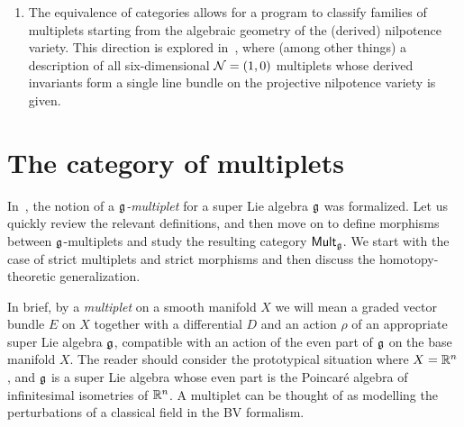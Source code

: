 \documentclass[pdftex]{sigma}
\numberwithin{equation}{section}
\def\cat#1{\ensuremath{\mathsf{#1}}}
\DeclareMathOperator{\Mult}{\cat{Mult}}
\begin{document}
\begin{enumerate}
	To give a further example, the tangent sheaf $\mathrm{Der}(C^\bullet(\fn))$ carries a Lie bracket for all supertranslation algebras $\fn$. While the associated multiplet is not generally associated to a BV theory---it does not typically carry a $-1$-shifted symplectic pairing---one can always build a BV theory by applying the cotangent theory construction and considering the multiplet $M \otimes M^![-1]$, where $M^! = M^* \otimes \Omega^{\mathrm{top}}(V)$ is the density-valued dual. This procedure allows for the construction of a very general family of interacting classical supersymmetric field theories.
	
	\item The equivalence of categories allows for a program to classify families of multiplets starting from the algebraic geometry of the (derived) nilpotence variety. This direction is explored in~\cite{HNSW6d}, where (among other things) a description of all six-dimensional $\mathcal N=(1,0)$ multiplets whose derived invariants form a single line bundle on the projective nilpotence variety is given.
\end{enumerate}


\section{The category of multiplets} \label{sec: multiplets}
In~\cite{perspectives}, the notion of a \emph{$\mathfrak g$-multiplet} for a super Lie algebra $\mathfrak g$ was formalized. Let us quickly review the relevant definitions, and then move on to define morphisms between $\mathfrak g$-multiplets and study the resulting category $\Mult_{\fg}$. We start with the case of strict multiplets and strict morphisms and then discuss the homotopy-theoretic generalization.

In brief, by a \emph{multiplet} on a smooth manifold $X$ we will mean a graded vector bundle $E$ on $X$ together with a differential $D$ and an action $\rho$ of an appropriate super Lie algebra $\mathfrak g$, compatible with an action of the even part of $\mathfrak g$ on the base manifold $X$. The reader should consider the prototypical situation where $X = \mathbb R^n$, and $\mathfrak g$ is a super Lie algebra whose even part is the Poincar\'e algebra of infinitesimal isometries of $\mathbb R^n$. A multiplet can be thought of as modelling the perturbations of a classical field in the BV formalism.
\end{document}
